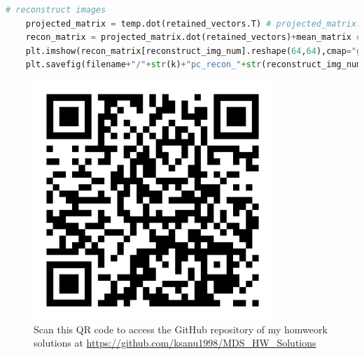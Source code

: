 \documentclass{article}
\begin{document}
\begin{flushleft}
\begin{lstlisting}[language=Python, title={Python code to perform PCA on images}]
    # reconstruct images
    projected_matrix = temp.dot(retained_vectors.T) # projected_matrix: 30 x k
    recon_matrix = projected_matrix.dot(retained_vectors)+mean_matrix # recon_matrix: 30 x 4096
    plt.imshow(recon_matrix[reconstruct_img_num].reshape(64,64),cmap="gray")
    plt.savefig(filename+"/"+str(k)+"pc_recon_"+str(reconstruct_img_num)+".png")
        \end{lstlisting}
        \clearpage
        \begin{figure}[htp]
                \centering
                \includegraphics[width=9cm]{./qr/qr-code.png}\\
                Scan this QR code to access the GitHub repository of my homweork solutions at \href{https://github.com/ksanu1998/MDS_HW_Solutions}{https://github.com/ksanu1998/MDS\_HW\_Solutions}
        \end{figure}
    \end{flushleft}
\end{document}
